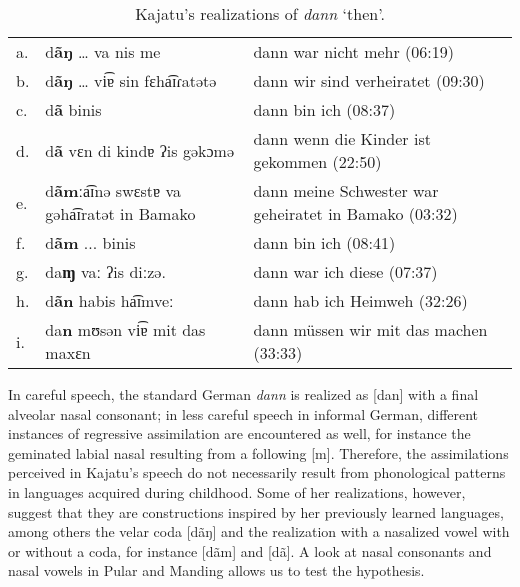 \documentclass[output=paper]{langscibook}
\begin{document}
\begin{table}
    \begin{tabularx}{\textwidth}{lXX}\midrule\toprule
        a. & d\textbf{ãŋ} … va nis   me                           & dann war nicht mehr   (06:19)                           \\
        b. & d\textbf{ãŋ} … vi͡ɐ sin   fɛha͡ɪɾatətə               & dann wir sind   verheiratet (09:30)                     \\
        c. & d\textbf{ã} binis                                    & dann bin ich (08:37)                                    \\
        d. & d\textbf{ã} vɛn di kindɐ   ʔis gəkɔmə                & dann wenn die   Kinder ist gekommen (22:50)             \\
        e. & d\textbf{ãm}ːa͡ɪnə swɛstɐ   va gəha͡ɪratət in Bamako & dann meine   Schwester war geheiratet in Bamako (03:32) \\
        f. & d\textbf{ãm} ... binis                               & dann bin ich (08:41)                                    \\
        g. & da\textbf{ɱ} vaː ʔis   diːzə.                         & dann war ich diese   (07:37)                            \\
        h. & d\textbf{ãn} habis ha͡ɪmveː                          & dann hab ich Heimweh   (32:26)                          \\
        i. & da\textbf{n} mʊsən   vi͡ɐ mit das maxɛn               & dann müssen wir mit   das machen (33:33)\\ \bottomrule\midrule
    \end{tabularx}
    \caption{Kajatu’s realizations of \textit{dann} ‘then’.}
    \label{fanego:tab:3}
\end{table}

In careful speech, the standard German \textit{dann} is realized as [dan] with a final alveolar nasal consonant; in less careful speech in informal German, different instances of regressive assimilation are encountered as well, for instance the geminated labial nasal resulting from a following [m]. Therefore, the assimilations perceived in Kajatu’s speech do not necessarily result from phonological patterns in languages acquired during childhood. Some of her realizations, however, suggest that they are constructions inspired by her previously learned languages, among others the velar coda [dãŋ] and the realization with a nasalized vowel with or without a coda, for instance [dãm] and [dã]. A look at nasal consonants and nasal vowels in Pular and Manding allows us to test the hypothesis. 
\end{document}
